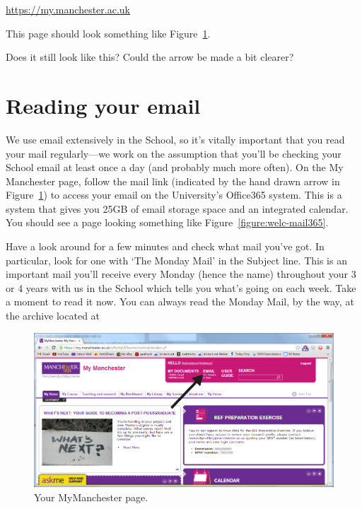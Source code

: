 \url{https://my.manchester.ac.uk}

This page should look something like Figure~\ref{figure:welc-mymanchester}.

\begin{demonote}
Does it still look like this? Could the arrow be made a bit clearer?
\end{demonote}
\section{Reading your email}

We use email extensively in the School, so it's vitally important that
you read your mail regularly---we work on the assumption that you'll be checking your School email at least once a day (and probably much
more often). On the My Manchester page, follow the mail link (indicated by the hand drawn arrow  in
Figure~\ref{figure:welc-mymanchester}) to access your email on the
University's Office365 system. This is a system that
gives you 25GB of email storage space and an integrated calendar. You should
see a page looking something like Figure~\ref{figure:welc-mail365}.

Have a look around for a few minutes and check what mail you've
got. In particular, look for one with `The Monday Mail' in the
Subject line. This is an important mail you'll receive every Monday
(hence the name) throughout your 3 or 4 years with us in the
School which  tells you what's going on each week. Take a moment to read it now. You can always read the Monday Mail, by the way, at the archive located at\\  

\begin{figure}
\centerline{\includegraphics[width=15cm]{images/hamza-email-link2.png}}
\caption{Your MyManchester page.}
\label{figure:welc-mymanchester}
\end{figure}

